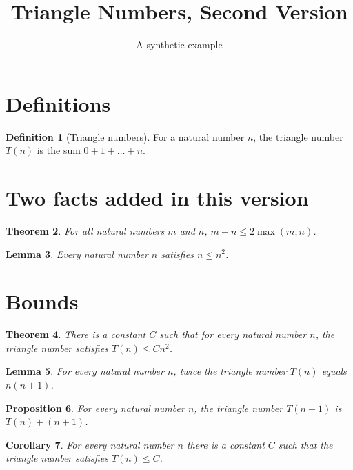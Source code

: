 \documentclass[11pt]{article}
\title{Triangle Numbers, Second Version}
\author{A synthetic example}
\date{}
\newtheorem{theorem}{Theorem}[section]
\newtheorem{lemma}[theorem]{Lemma}
\newtheorem{proposition}[theorem]{Proposition}
\newtheorem{corollary}[theorem]{Corollary}
\theoremstyle{definition}
\newtheorem{definition}[theorem]{Definition}
\begin{document}
\maketitle

\section{Definitions}

\begin{definition}[Triangle numbers]\label{def:triangle}
For a natural number $n$, the triangle number $T(n)$ is the sum $0 + 1 + \dots + n$.
\end{definition}

\section{Two facts added in this version}

\begin{theorem}\label{thm:max}
For all natural numbers $m$ and $n$, $m + n \le 2 \max(m, n)$.
\end{theorem}

\begin{lemma}\label{lem:sq}
Every natural number $n$ satisfies $n \le n^2$.
\end{lemma}

\section{Bounds}

\begin{theorem}\label{thm:bound}
There is a constant $C$ such that for every natural number $n$, the triangle number satisfies
$T(n) \le C n^2$.
\end{theorem}

\begin{lemma}\label{lem:twice}
For every natural number $n$, twice the triangle number $T(n)$ equals $n(n+1)$.
\end{lemma}

\begin{proposition}\label{prop:succ}
For every natural number $n$, the triangle number $T(n+1)$ is $T(n) + (n + 1)$.
\end{proposition}

\begin{corollary}\label{cor:const}
For every natural number $n$ there is a constant $C$ such that the triangle number
satisfies $T(n) \le C$.
\end{corollary}
\end{document}
